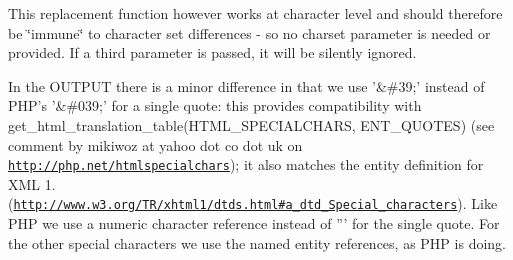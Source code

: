This replacement function however works at character level and should therefore be \char`\"{}immune\char`\"{} to character set differences -\/ so no charset parameter is needed or provided. If a third parameter is passed, it will be silently ignored.

In the O\-U\-T\-P\-U\-T there is a minor difference in that we use '\&\#39;' instead of P\-H\-P's '\&\#039;' for a single quote\-: this provides compatibility with get\-\_\-html\-\_\-translation\-\_\-table(\-H\-T\-M\-L\-\_\-\-S\-P\-E\-C\-I\-A\-L\-C\-H\-A\-R\-S, E\-N\-T\-\_\-\-Q\-U\-O\-T\-E\-S) (see comment by mikiwoz at yahoo dot co dot uk on \href{http://php.net/htmlspecialchars}{\tt http\-://php.\-net/htmlspecialchars}); it also matches the entity definition for X\-M\-L 1. (\href{http://www.w3.org/TR/xhtml1/dtds.html#a_dtd_Special_characters}{\tt http\-://www.\-w3.\-org/\-T\-R/xhtml1/dtds.\-html\#a\-\_\-dtd\-\_\-\-Special\-\_\-characters}). Like P\-H\-P we use a numeric character reference instead of ''' for the single quote. For the other special characters we use the named entity references, as P\-H\-P is doing.

